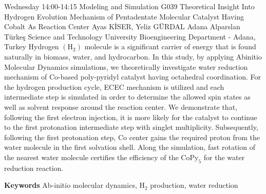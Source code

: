
    \begin{abstract_basarim}
    {Wednesday 14:00-14:15}
    {Modeling and Simulation}
    {G039}
    {Theoretical Insight Into Hydrogen Evolution Mechanism of Pentadentate Molecular Catalyst Having Cobalt As Reaction Center}
    {%
    Ayas KİSER, Yeliz GÜRDAL}
    {%
    }
    {%
    Adana Alparslan Türkeş Science and Technology University Bioengineering Department - Adana, Turkey}
    Hydrogen $\left(\mathrm{H}_{2}\right)$ molecule is a significant carrier of energy that is found naturally in biomass, water, and hydrocarbon. In this study, by applying Abinitio Molecular Dynamics simulations, we theoretically investigate water reduction mechanism of Co-based poly-pyridyl catalyst having octahedral coordination. For the hydrogen production cycle, ECEC mechanism is utilized and each intermediate step is simulated in order to determine the allowed spin states as well as solvent response around the reaction center. We demonstrate that, following the first electron injection, it is more likely for the catalyst to continue to the first protonation intermediate step with singlet multiplicity. Subsequently, following the first protonation step, Co center gains the required proton from the water molecule in the first solvation shell. Along the simulation, fast rotation of the nearest water molecule certifies the efficiency of the $\mathrm{CoPy}_{5}$ for the water reduction reaction. 
    
        \textbf{Keywords} \newline{}Ab-initio molecular dynamics, $\mathrm{H}_{2}$ production, water reduction
    \end{abstract_basarim}
    